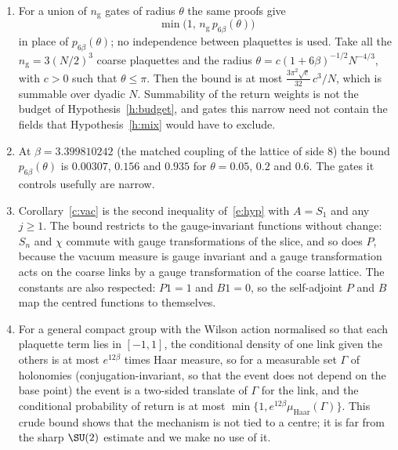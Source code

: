 \begin{remark}\label{r:ret}
\leavevmode
\begin{enumerate}
\item[(a)] For a union of $n_{\mathrm g}$ gates of radius $\theta$ the same proofs give
\[\min\big(1,\,n_{\mathrm g}\,p_{6\beta}(\theta)\big)\]
in place of $p_{6\beta}(\theta)$; no independence between plaquettes is used. Take all the
$n_{\mathrm g}=3(N/2)^3$ coarse plaquettes and the radius $\theta=c(1+6\beta)^{-1/2}N^{-4/3}$, with $c>0$ such that
$\theta\le\pi$. Then the bound is at most $\tfrac{3\pi^2\sqrt e}{32}\,c^3/N$, which is summable over dyadic $N$. Summability of the return weights is not the budget of
Hypothesis~\ref{h:budget}, and gates this narrow need not contain the fields that Hypothesis~\ref{h:mix}
would have to exclude.
\item[(b)] At $\beta=3.399810242$ (the matched coupling of the lattice of side $8$) the bound $p_{6\beta}(\theta)$ is $0.00307$, $0.156$ and $0.935$ for
$\theta=0.05$, $0.2$ and $0.6$. The gates it controls usefully are narrow.
\item[(c)] Corollary~\ref{c:vac} is the
second inequality of~\eqref{e:hyp} with $A=S_1$ and any $j\ge1$. The bound restricts to the gauge-invariant functions without change: $S_n$ and $\chi$ commute with gauge
transformations of the slice, and so does $P$, because the vacuum measure is gauge invariant and a gauge
transformation acts on the coarse links by a gauge transformation of the coarse lattice. The constants are also respected: $P1=1$ and $B1=0$, so the self-adjoint $P$ and $B$ map the
centred functions to themselves.
\item[(d)] For a general compact group with the Wilson action normalised so that each plaquette term lies in
$[-1,1]$, the conditional density of one link given the others is at most $e^{12\beta}$ times Haar measure,
so for a measurable set $\Gamma$ of holonomies (conjugation-invariant, so that the event does not depend on the
base point) the event is a two-sided translate of $\Gamma$ for the link, and the conditional probability of return
is at most $\min\{1,e^{12\beta}\mu_{\mathrm{Haar}}(\Gamma)\}$. This crude bound shows that the mechanism is not tied to a
centre; it is far from the sharp $\SU(2)$ estimate and we make no use of it.
\end{enumerate}
\end{remark}

